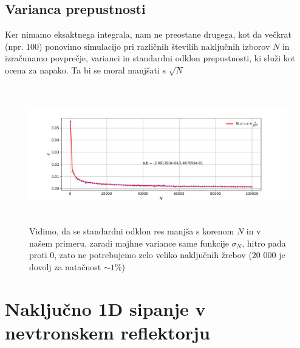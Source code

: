 \documentclass[11pt, a4paper]{article}
\begin{document}
\subsection{Varianca prepustnosti}
Ker nimamo eksaktnega integrala, nam ne preostane drugega, kot da večkrat (npr. 100) ponovimo simulacijo pri različnih številih naključnih izborov $N$ in izračunamo povprečje, varianci in standardni odklon prepustnosti, ki služi kot ocena za napako. Ta bi se moral manjšati s $\sqrt{N}$
\begin{figure}[H]
\hspace*{-2.5cm}  
  \includegraphics[width=22cm, height = 6cm]{varianca_druga.png}
 \caption{Vidimo, da se standardni odklon res manjša s korenom $N$ in v našem primeru, zaradi majhne variance same funkcije $\sigma_N$, hitro pada proti 0, zato ne potrebujemo zelo veliko naključnih žrebov (20 000 je dovolj za natačnost $\sim 1\%$)}
\end{figure}
\section{Naključno 1D sipanje v nevtronskem reflektorju}
\end{document}
